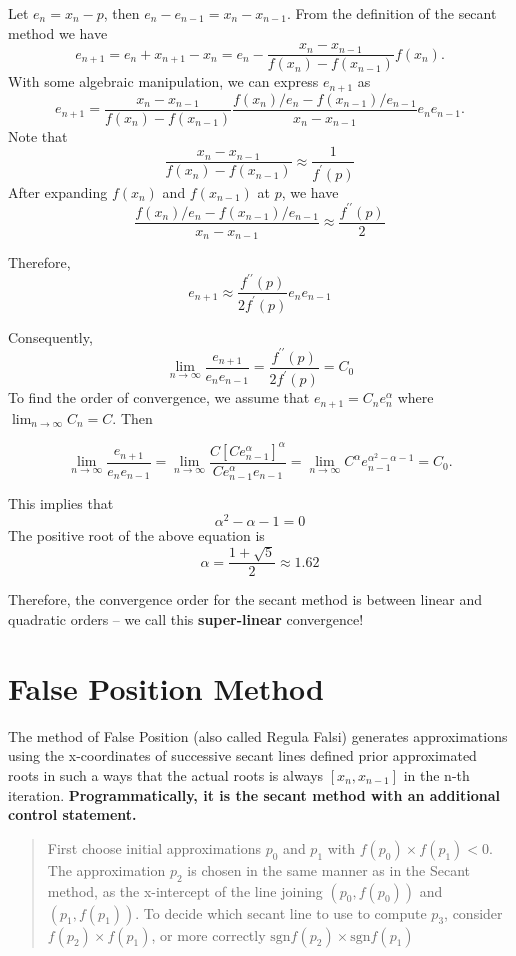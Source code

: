 \documentclass[
]{book}
\begin{document}
Let \(e_n = x_n - p\), then \(e_n - e_{n-1} = x_n - x_{n-1}\). From the definition of the secant method we have
\[
e_{n+1} = e_n + x_{n+1} - x_n = e_n -\frac{x_n-x_{n-1}}{f(x_n)-f(x_{n-1})}f(x_n).
\]
With some algebraic manipulation, we can express \(e_{n+1}\) as
\[
e_{n+1} = \frac{x_n-x_{n-1}}{f(x_n)-f(x_{n-1})}\frac{f(x_n)/e_n - f(x_{n-1})/e_{n-1}}{x_n-x_{n-1}}e_ne_{n-1}.
\]
Note that
\[
\frac{x_n-x_{n-1}}{f(x_n)-f(x_{n-1})} \approx \frac{1}{f^\prime(p)}
\]
After expanding \(f(x_n)\) and \(f(x_{n-1})\) at \(p\), we have
\[
\frac{f(x_n)/e_n - f(x_{n-1})/e_{n-1}}{x_n-x_{n-1}} \approx \frac{f^{\prime\prime}(p)}{2}
\]

Therefore,
\[
e_{n+1} \approx \frac{f^{\prime\prime}(p)}{2f^\prime(p)}e_ne_{n-1}
\]

Consequently,
\[
\lim_{n\to \infty}\frac{e_{n+1}}{e_ne_{n-1}} = \frac{f^{\prime\prime}(p)}{2f^\prime(p)} = C_0
\]
To find the order of convergence, we assume that \(e_{n+1} = C_ne_n^\alpha\) where \(\lim_{n \to \infty} C_n = C\). Then

\[
\lim_{n\to \infty}\frac{e_{n+1}}{e_ne_{n-1}}=\lim_{n\to \infty}\frac{C[Ce_{n-1}^\alpha]^\alpha}{Ce^\alpha_{n-1}e_{n-1}} = \lim_{n\to\infty}C^\alpha e_{n-1}^{\alpha^2-\alpha -1} = C_0.
\]

This implies that
\[
\alpha^2 -\alpha - 1 = 0
\]
The positive root of the above equation is
\[
\alpha = \frac{1+\sqrt{5}}{2} \approx 1.62
\]

Therefore, the convergence order for the secant method is between linear and quadratic orders -- we call this \textbf{super-linear} convergence!

\hfill\break

\hypertarget{false-position-method}{%
\section{False Position Method}\label{false-position-method}}

The method of False Position (also called Regula Falsi) generates approximations using the x-coordinates of successive secant lines defined prior approximated roots in such a ways that the actual roots is always \([x_n, x_{n-1}]\) in the n-th iteration. \textbf{\color{red}Programmatically, it is the secant method with an additional control statement.}

\begin{quote}
First choose initial approximations \(p_0\) and \(p_1\) with \(f ( p_0) \times f ( p_1) < 0\). The approximation \(p_2\) is chosen in the same manner as in the Secant method, as the x-intercept of the line joining \(( p_0, f ( p_0))\) and \(( p_1, f ( p_1))\). To decide which secant line to use to compute \(p_3\), consider \(f ( p_2) \times f ( p_1)\), or more correctly \(\text{sgn} f ( p_2) \times \text{sgn} f ( p_1)\)
\end{quote}
\end{document}

